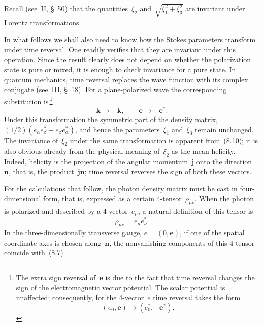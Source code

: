 Recall (see~II, \S~50) that the quantities~$\xi_2$ and~$\sqrt{\xi_1^2 + \xi_3^2}$ are invariant under Lorentz transformations.

In what follows we shall also need to know how the Stokes parameters transform under time reversal. One readily verifies that they are invariant under this operation. Since the result clearly does not depend on whether the polarization state is pure or mixed, it is enough to check invariance for a pure state. In quantum mechanics, time reversal replaces the wave function with its complex conjugate (see~III, \S~18). For a plane-polarized wave the corresponding substitution is\,\footnote{The extra sign reversal of~$\mathbf{e}$ is due to the fact that time reversal changes the sign of the electromagnetic vector potential. The scalar potential is unaffected; consequently, for the 4-vector~$e$ time reversal takes the form
\begin{equation}
(e_0, \mathbf{e}) \to (e_0^*, -\mathbf{e}^*).
\tag{8.11a}
\end{equation}}
\begin{equation}
\mathbf{k} \to -\mathbf{k}, \qquad \mathbf{e} \to -\mathbf{e}^*.
\tag{8.11}
\end{equation}
Under this transformation the symmetric part of the density matrix, $(1/2)(e_\alpha e_\beta^* + e_\beta e_\alpha^*)$, and hence the parameters~$\xi_1$ and~$\xi_3$ remain unchanged. The invariance of~$\xi_2$ under the same transformation is apparent from~(8.10); it is also obvious already from the physical meaning of~$\xi_2$ as the mean helicity. Indeed, helicity is the projection of the angular momentum~$\mathbf{j}$ onto the direction~$\mathbf{n}$, that is, the product~$\mathbf{jn}$; time reversal reverses the sign of both these vectors.

For the calculations that follow, the photon density matrix must be cast in four-dimensional form, that is, expressed as a certain 4-tensor~$\rho_{\mu\nu}$. When the photon is polarized and described by a 4-vector~$e_\mu$, a natural definition of this tensor is
\begin{equation}
\rho_{\mu\nu} = e_\mu e_\nu^*.
\tag{8.12}
\end{equation}
In the three-dimensionally transverse gauge, $e = (0, \mathbf{e})$, if one of the spatial coordinate axes is chosen along~$\mathbf{n}$, the nonvanishing components of this 4-tensor coincide with~(8.7).

